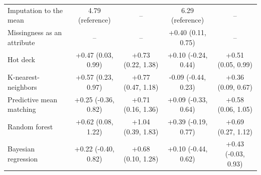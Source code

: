 \documentclass{article}
\begin{document}
\begin{table}
\begin{tabular}{lcccc}
\midrule
Imputation to the mean & 4.79 (reference) & -- & 6.29 (reference) & -- \\ 
Missingness as an attribute & -- & -- & +0.40 (0.11, 0.75) & -- \\ 
Hot deck & +0.47 (0.03, 0.99) & +0.73 (0.22, 1.38) & +0.10 (-0.24, 0.44) & +0.51 (0.05, 0.99) \\ 
K-nearest-neighbors & +0.57 (0.23, 0.97) & +0.77 (0.47, 1.18) & -0.09 (-0.44, 0.23) & +0.36 (0.09, 0.67) \\ 
Predictive mean matching & +0.25 (-0.36, 0.82) & +0.71 (0.16, 1.36) & +0.09 (-0.33, 0.64) & +0.58 (0.06, 1.05) \\ 
Random forest & +0.62 (0.08, 1.22) & +1.04 (0.39, 1.83) & +0.39 (-0.19, 0.77) & +0.69 (0.27, 1.12) \\ 
Bayesian regression & +0.22 (-0.40, 0.82) & +0.68 (0.10, 1.28) & +0.10 (-0.44, 0.62) & +0.43 (-0.03, 0.93) \\ 
\bottomrule
\end{tabular} 
 \end{table}

\clearpage
\end{document}
